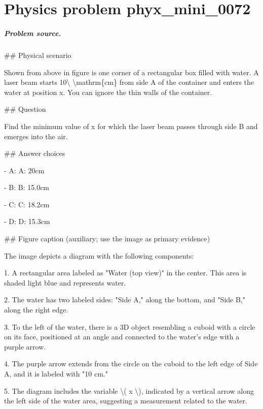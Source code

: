 
\chapter{Physics problem phyx\_mini\_0072}
\label{ch:PhyXMiniProblems_problem_phyx_mini_0072}

\paragraph{Problem source.}
\#\# Physical scenario

Shown from above in figure is one corner of a rectangular box filled with water. A laser beam starts 10\textbackslash{} \textbackslash{}mathrm\{cm\} from side A of the container and enters the water at position x. You can ignore the thin walls of the container.

\#\# Question

Find the minimum value of x for which the laser beam passes through side B and emerges into the air.

\#\# Answer choices

- A: A: 20cm

- B: B: 15.0cm

- C: C: 18.2cm

- D: D: 15.3cm

\#\# Figure caption (auxiliary; use the image as primary evidence)

The image depicts a diagram with the following components:

1. A rectangular area labeled as "Water (top view)" in the center. This area is shaded light blue and represents water.

2. The water has two labeled sides: "Side A," along the bottom, and "Side B," along the right edge.

3. To the left of the water, there is a 3D object resembling a cuboid with a circle on its face, positioned at an angle and connected to the water's edge with a purple arrow.

4. The purple arrow extends from the circle on the cuboid to the left edge of Side A, and it is labeled with "10 cm."

5. The diagram includes the variable \textbackslash{}( x \textbackslash{}), indicated by a vertical arrow along the left side of the water area, suggesting a measurement related to the water.

